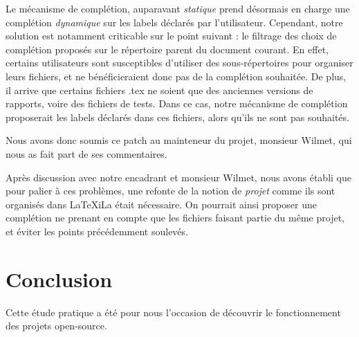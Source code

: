 \documentclass[a4paper,11pt]{report}
\begin{document}
Le mécanisme de complétion, auparavant \textit{statique} prend désormais en charge une complétion \textit{dynamique} sur les labels déclarés par l'utilisateur. Cependant, notre solution est notamment criticable sur le point suivant : le filtrage des choix de complétion proposés sur le répertoire parent du document courant. En effet, certains utilisateurs sont susceptibles d'utiliser des sous-répertoires pour organiser leurs fichiers, et ne bénéficieraient donc pas de la complétion souhaitée. De plus, il arrive que certains fichiers .tex ne soient que des anciennes versions de rapports, voire des fichiers de tests. Dans ce cas, notre mécanisme de complétion proposerait les labels déclarés dans ces fichiers, alors qu'ils ne sont pas souhaités.

Nous avons donc soumis ce patch au mainteneur du projet, monsieur Wilmet, qui nous as fait part de ses commentaires.

Après discussion avec notre encadrant et monsieur Wilmet, nous avons établi que pour palier à ces problèmes, une refonte de la notion de \textit{projet} comme ils sont organisés dans LaTeXiLa était nécessaire. On pourrait ainsi proposer une complétion ne prenant en compte que les fichiers faisant partie du même projet, et éviter les points précédemment soulevés.
\chapter{Conclusion}
Cette étude pratique a été pour nous l'occasion de découvrir le fonctionnement des projets open-source.
\end{document}
